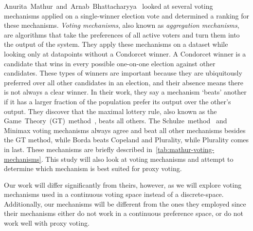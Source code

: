 Anurita~Mathur~and~Arnab~Bhattacharyya~\cite{Mathur2017} looked at several voting
mechanisms applied on a single-winner election vote and determined a ranking for
these mechanisms.
\textit{Voting mechanisms}, also known as \textit{aggregation mechanisms}, are
algorithms that take the preferences of all active voters and turn them into the
output of the system.
They apply these mechanisms on a dataset while looking only at datapoints without a
Condorcet winner.
A Condorcet winner is a candidate that wins in every possible one-on-one election
against other candidates.
These types of winners are important because they are ubiquitously preferred over
all other candidates in an election, and their absence means there is not always a
clear winner.
In their work, they say a mechanism `beats' another if it has a larger fraction of
the population prefer its output over the other's output.
They discover that the maximal lottery rule, also known as the
Game~Theory~(GT)~method~\cite{Rivest2010}, beats all others.
The Schulze~method~\cite{Schulze2011} and Minimax voting mechanisms always agree and
beat all other mechanisms besides the GT method, while Borda beats Copeland and
Plurality, while Plurality comes in last.
These mechanisms are briefly described in~\autoref{tab:mathur-voting-mechanisms}.
This study will also look at voting mechanisms and attempt to determine which
mechanism is best suited for proxy voting.

Our work will differ significantly from theirs, however, as we will explore voting
mechanisms used in a continuous voting space instead of a discrete-space.
Additionally, our mechanisms will be different from the ones they employed since
their mechanisms either do not work in a continuous preference space, or do not work
well with proxy voting.

